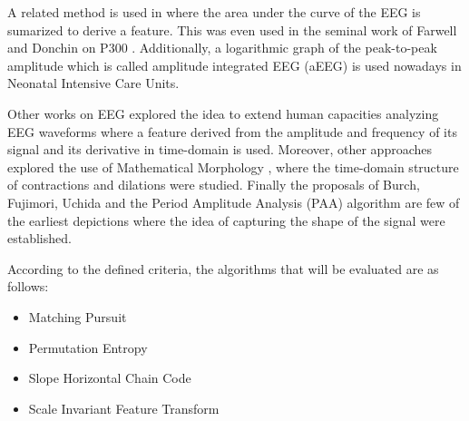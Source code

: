 \documentclass[brainsci,article,submit,moreauthors,pdftex,10pt,a4paper]{mdpi}
\begin{document}
A related method is used in \citep{Alvarado-Gonzalez2016} where the area under the curve of the EEG is sumarized to derive a feature.  This was even used in the seminal work of Farwell and Donchin on P300 \citep{Farwell1988,WolpawJonathanR2012}. Additionally, a logarithmic graph of the peak-to-peak amplitude which is called amplitude integrated EEG (aEEG) \citep{Shah2015} is used nowadays in Neonatal Intensive Care Units.

Other works on EEG explored the idea to extend human capacities analyzing EEG waveforms \citep{Klein1976} where a feature derived from the amplitude and frequency of its signal and its derivative in time-domain is used.  Moreover, other approaches explored the use of Mathematical Morphology \citep{Yamaguchi2009}, where the time-domain structure of contractions and dilations were studied. Finally the proposals of Burch, Fujimori, Uchida and the Period Amplitude Analysis (PAA) \citep{Uchida1996} algorithm are few of the earliest depictions where the idea of capturing the shape of the signal were established.



%
%
%
%
%
%
%
%
%
%

According to the defined criteria, the algorithms that will be evaluated are as follows:

\begin{itemize}
\item Matching Pursuit
\item Permutation Entropy
\item Slope Horizontal Chain Code
\item Scale Invariant Feature Transform
\end{itemize}
\end{document}
